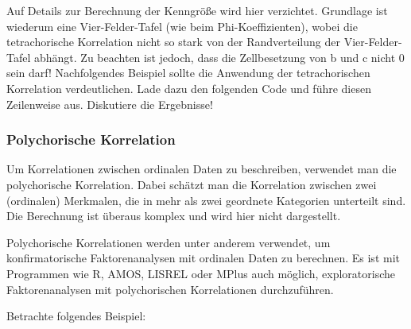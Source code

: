\documentclass[
]{article}
\newenvironment{Shaded}{\begin{snugshade}}{\end{snugshade}}
\newcommand{\CommentTok}[1]{\textcolor[rgb]{0.56,0.35,0.01}{\textit{#1}}}
\newcommand{\FunctionTok}[1]{\textcolor[rgb]{0.13,0.29,0.53}{\textbf{#1}}}
\newcommand{\NormalTok}[1]{#1}
\newcommand{\OtherTok}[1]{\textcolor[rgb]{0.56,0.35,0.01}{#1}}
\newcommand{\SpecialCharTok}[1]{\textcolor[rgb]{0.81,0.36,0.00}{\textbf{#1}}}
\newcommand{\StringTok}[1]{\textcolor[rgb]{0.31,0.60,0.02}{#1}}
\begin{document}
Auf Details zur Berechnung der Kenngröße wird hier verzichtet. Grundlage ist wiederum eine Vier-Felder-Tafel (wie beim Phi-Koeffizienten), wobei die tetrachorische Korrelation nicht so stark von der Randverteilung der Vier-Felder-Tafel abhängt. Zu beachten ist jedoch, dass die Zellbesetzung von b und c nicht 0 sein darf! Nachfolgendes Beispiel sollte die Anwendung der tetrachorischen Korrelation verdeutlichen. Lade dazu den folgenden Code und führe diesen Zeilenweise aus. Diskutiere die Ergebnisse!

\begin{Shaded}
\end{Shaded}

\subsubsection*{Polychorische Korrelation}\label{polychorische-korrelation}

Um Korrelationen zwischen ordinalen Daten zu beschreiben, verwendet man die polychorische Korrelation. Dabei schätzt man die Korrelation zwischen zwei (ordinalen) Merkmalen, die in mehr als zwei geordnete Kategorien unterteilt sind. Die Berechnung ist überaus komplex und wird hier nicht dargestellt.

Polychorische Korrelationen werden unter anderem verwendet, um konfirmatorische Faktorenanalysen mit ordinalen Daten zu berechnen. Es ist mit Programmen wie R, AMOS, LISREL oder MPlus auch möglich, exploratorische Faktorenanalysen mit polychorischen Korrelationen durchzuführen.

Betrachte folgendes Beispiel:
\end{document}
